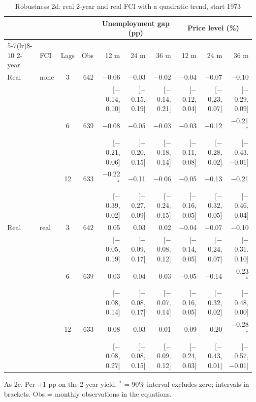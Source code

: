 \begin{table}[p]\centering\footnotesize\setlength{\tabcolsep}{2.2pt}
\caption{Robustness 2d: real 2-year and real FCI with a quadratic trend, start 1973}\label{tab:R2d}
\begin{tabular}{llcrrrrrrr}\toprule
 & & & & \multicolumn{3}{c}{Unemployment gap (pp)} & \multicolumn{3}{c}{Price level (\%)}\\ \cmidrule(lr){5-7}\cmidrule(lr){8-10}
2-year & FCI & Lags & Obs & 12 m & 24 m & 36 m & 12 m & 24 m & 36 m\\ \midrule
Real & none & 3 & 642 & $-$0.06 & $-$0.03 & $-$0.02 & $-$0.04 & $-$0.07 & $-$0.10\\
 & & & & {\scriptsize [$-$0.14, 0.10]} & {\scriptsize [$-$0.15, 0.19]} & {\scriptsize [$-$0.14, 0.21]} & {\scriptsize [$-$0.12, 0.04]} & {\scriptsize [$-$0.23, 0.07]} & {\scriptsize [$-$0.29, 0.09]}\\
 &  & 6 & 639 & $-$0.08 & $-$0.05 & $-$0.03 & $-$0.03 & $-$0.12 & $-$0.21$^{*}$\\
 & & & & {\scriptsize [$-$0.21, 0.06]} & {\scriptsize [$-$0.20, 0.15]} & {\scriptsize [$-$0.18, 0.14]} & {\scriptsize [$-$0.11, 0.08]} & {\scriptsize [$-$0.28, 0.02]} & {\scriptsize [$-$0.43, $-$0.01]}\\
 &  & 12 & 633 & $-$0.22$^{*}$ & $-$0.11 & $-$0.06 & $-$0.05 & $-$0.13 & $-$0.21\\
 & & & & {\scriptsize [$-$0.39, $-$0.02]} & {\scriptsize [$-$0.27, 0.09]} & {\scriptsize [$-$0.24, 0.15]} & {\scriptsize [$-$0.16, 0.05]} & {\scriptsize [$-$0.32, 0.05]} & {\scriptsize [$-$0.46, 0.04]}\\
Real & real & 3 & 642 & 0.05 & 0.03 & 0.02 & $-$0.04 & $-$0.07 & $-$0.10\\
 & & & & {\scriptsize [$-$0.05, 0.19]} & {\scriptsize [$-$0.09, 0.17]} & {\scriptsize [$-$0.08, 0.12]} & {\scriptsize [$-$0.14, 0.05]} & {\scriptsize [$-$0.24, 0.07]} & {\scriptsize [$-$0.31, 0.10]}\\
 &  & 6 & 639 & 0.03 & 0.04 & 0.03 & $-$0.05 & $-$0.14 & $-$0.23$^{*}$\\
 & & & & {\scriptsize [$-$0.08, 0.14]} & {\scriptsize [$-$0.08, 0.17]} & {\scriptsize [$-$0.07, 0.14]} & {\scriptsize [$-$0.16, 0.05]} & {\scriptsize [$-$0.32, 0.02]} & {\scriptsize [$-$0.48, 0.00]}\\
 &  & 12 & 633 & 0.08 & 0.03 & 0.01 & $-$0.09 & $-$0.20 & $-$0.28$^{*}$\\
 & & & & {\scriptsize [$-$0.08, 0.27]} & {\scriptsize [$-$0.08, 0.15]} & {\scriptsize [$-$0.09, 0.12]} & {\scriptsize [$-$0.24, 0.03]} & {\scriptsize [$-$0.43, 0.01]} & {\scriptsize [$-$0.57, $-$0.01]}\\
\bottomrule\end{tabular}
\par\smallskip\parbox{0.96\linewidth}{\scriptsize As 2c. Per +1 pp on the 2-year yield. $^{*}$ = 90\% interval excludes zero; intervals in brackets. Obs = monthly observations in the equations.}
\end{table}
